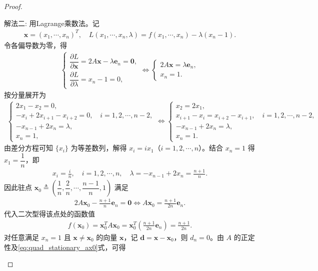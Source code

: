 \documentclass[../../main.tex]{subfiles}%
\begin{document}
\begin{proof}
\begin{enumerate}[(1)]
{\color{blue}解法二:}
用Lagrange乘数法。记
\begin{align*}
\bm{x} = (x_1,\cdots,x_n)^T, \quad L(x_1,\cdots,x_n,\lambda) = f(x_1,\cdots,x_n) - \lambda(x_n - 1).
\end{align*}
令各偏导数为零，得
\begin{align*}
\begin{cases}
\dfrac{\partial L}{\partial \bm{x}} = 2A\bm{x} - \lambda \bm{e}_n = \bm{0}, \\
\dfrac{\partial L}{\partial \lambda} = x_n - 1 = 0,
\end{cases}
\iff
\begin{cases}
2A\bm{x} = \lambda \bm{e}_n, \\
x_n = 1.
\end{cases}
\end{align*}
按分量展开为
\begin{align*}
\begin{cases}
2x_1 - x_2 = 0, \\
-x_i + 2x_{i+1} - x_{i+2} = 0, \quad i = 1,2,\cdots,n-2, \\
-x_{n-1} + 2x_n = \lambda, \\
x_n = 1,
\end{cases}
\iff
\begin{cases}
x_2 = 2x_1, \\
x_{i+1} - x_i = x_{i+2} - x_{i+1}, \quad i = 1,2,\cdots,n-2, \\
-x_{n-1} + 2x_n = \lambda, \\
x_n = 1.
\end{cases}
\end{align*}
由差分方程可知 $\{x_i\}$ 为等差数列，解得 $x_i = i x_1$（$i=1,2,\cdots,n$）。结合 $x_n=1$ 得 $x_1 = \dfrac{1}{n}$，即
\begin{align*}
x_i = \frac{i}{n},\quad i = 1,2,\cdots,n, \quad \lambda = -x_{n-1} + 2x_n = \frac{n+1}{n}.
\end{align*}
因此驻点 $\bm{x}_0 \triangleq \left( \dfrac{1}{n},\dfrac{2}{n},\cdots,\dfrac{n-1}{n},1 \right)$ 满足
\begin{align}
2A\bm{x}_0 - \frac{n+1}{n}\bm{e}_n = \bm{0}
\iff
A\bm{x}_0 = \frac{n+1}{2n}\bm{e}_n.
\label{eq:quad_stationary_ax0}
\end{align}
代入二次型得该点处的函数值
\begin{align*}
f(\bm{x}_0) = \bm{x}_0^T A \bm{x}_0 = \bm{x}_0^T \left( \frac{n+1}{2n}\bm{e}_n \right) = \frac{n+1}{2n}.
\end{align*}
对任意满足 $x_n=1$ 且 $\bm{x} \neq \bm{x}_0$ 的向量 $\bm{x}$，记 $\bm{d} = \bm{x} - \bm{x}_0$，则 $d_n = 0$。由 $A$ 的正定性及\eqref{eq:quad_stationary_ax0}式，可得

\end{enumerate}
\end{proof}
\end{document}
